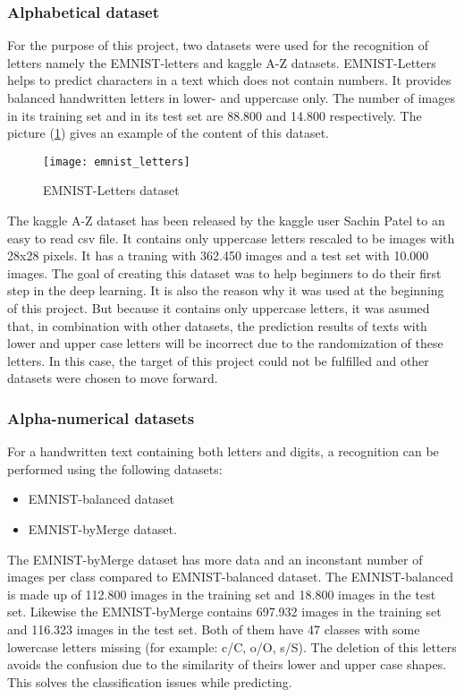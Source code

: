 \subsubsection{Alphabetical dataset}
For the purpose of this project, two datasets were used for the recognition of letters namely the EMNIST-letters and kaggle A-Z datasets.
EMNIST-Letters helps to predict characters in a text which does not contain numbers. 
It provides balanced handwritten letters in lower- and uppercase only. 
The number of images in its training set and in its test set are 88.800 and 14.800 respectively. \hfill \break
\noindent
The picture (\ref{Abb:emnist_letters}) gives an example of the content of this dataset.

\begin{figure}[htb]
	\centering
	\texttt{[image: emnist\_letters]}
	\caption[EMNIST-Letters datasets]{EMNIST-Letters dataset}\label{Abb:emnist_letters}
\end{figure}

The kaggle A-Z dataset has been released by the kaggle user Sachin Patel to an easy to read csv file. 
It contains only uppercase letters rescaled to be images with 28x28 pixels. 
It has a traning with 362.450 images and a test set with 10.000 images.
The goal of creating this dataset was to help beginners to do their first step in the deep learning. 
It is also the reason why it was used at the beginning of this project.  
But because it contains only uppercase letters, it was asumed that, in combination with other datasets, 
the prediction results of texts with lower and upper case letters will be incorrect due to the randomization of these letters. 
In this case, the target of this project could not be fulfilled and other datasets were chosen to move forward. 

\subsubsection{Alpha-numerical datasets}
For a handwritten text containing both letters and digits, a recognition can be performed using the following datasets: 

\begin{itemize}
    \item EMNIST-balanced dataset
    \item EMNIST-byMerge dataset.
  \end{itemize}

\noindent
The EMNIST-byMerge dataset has more data and an inconstant number of images per class compared to 
EMNIST-balanced dataset. 
The EMNIST-balanced is made up of 112.800 images in the training set and 18.800 images in the test set. 
Likewise the EMNIST-byMerge contains 697.932 images in the training set and 116.323 images in the test set. 
Both of them have 47 classes with some lowercase letters missing (for example: c/C, o/O, s/S). 
The deletion of this letters avoids the confusion due to the similarity of theirs lower and upper case shapes. 
This solves the classification issues while predicting. 
\hfill \break

